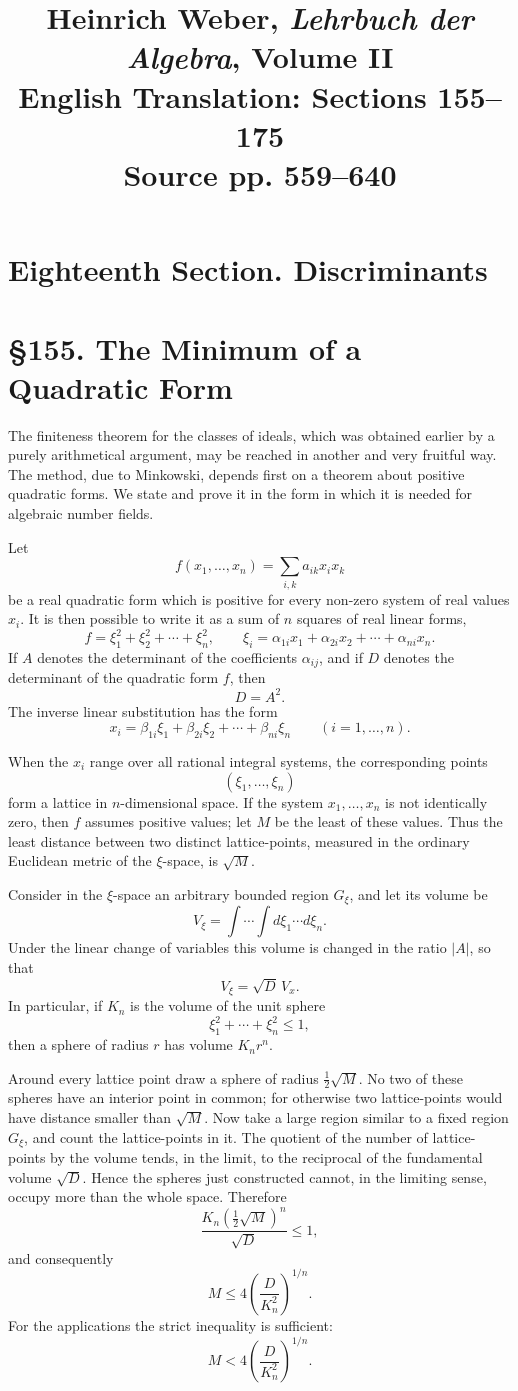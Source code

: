 \documentclass[12pt,a4paper]{article}
\title{Heinrich Weber, \emph{Lehrbuch der Algebra}, Volume II\\English Translation: Sections 155--175\\Source pp. 559--640}
\author{}
\date{}
\newcommand{\webersection}[2]{\clearpage\section*{\S #1. #2}}
\newcommand{\booktitle}[1]{\clearpage\section*{#1}}
\begin{document}
\maketitle


\booktitle{Eighteenth Section. Discriminants}

\webersection{155}{The Minimum of a Quadratic Form}

The finiteness theorem for the classes of ideals, which was obtained earlier by a purely arithmetical argument, may be reached in another and very fruitful way.  The method, due to Minkowski, depends first on a theorem about positive quadratic forms.  We state and prove it in the form in which it is needed for algebraic number fields.

Let
\[
  f(x_1,\ldots,x_n)=\sum_{i,k} a_{ik}x_i x_k
\]
be a real quadratic form which is positive for every non-zero system of real values \(x_i\).  It is then possible to write it as a sum of \(n\) squares of real linear forms,
\[
  f=\xi_1^2+\xi_2^2+\cdots+\xi_n^2,\qquad
  \xi_i=\alpha_{1i}x_1+\alpha_{2i}x_2+\cdots+\alpha_{ni}x_n.
\]
If \(A\) denotes the determinant of the coefficients \(\alpha_{ij}\), and if \(D\) denotes the determinant of the quadratic form \(f\), then
\[
  D=A^2.
\]
The inverse linear substitution has the form
\[
  x_i=\beta_{1i}\xi_1+\beta_{2i}\xi_2+\cdots+\beta_{ni}\xi_n
  \qquad (i=1,\ldots,n).
\]

When the \(x_i\) range over all rational integral systems, the corresponding points
\[
  (\xi_1,\ldots,\xi_n)
\]
form a lattice in \(n\)-dimensional space.  If the system \(x_1,\ldots,x_n\) is not identically zero, then \(f\) assumes positive values; let \(M\) be the least of these values.  Thus the least distance between two distinct lattice-points, measured in the ordinary Euclidean metric of the \(\xi\)-space, is \(\sqrt M\).

Consider in the \(\xi\)-space an arbitrary bounded region \(G_\xi\), and let its volume be
\[
  V_\xi=\int\cdots\int d\xi_1\cdots d\xi_n.
\]
Under the linear change of variables this volume is changed in the ratio \(|A|\), so that
\[
  V_\xi=\sqrt D\,V_x.
\]
In particular, if \(K_n\) is the volume of the unit sphere
\[
  \xi_1^2+\cdots+\xi_n^2\le 1,
\]
then a sphere of radius \(r\) has volume \(K_n r^n\).

Around every lattice point draw a sphere of radius \(\frac12\sqrt M\).  No two of these spheres have an interior point in common; for otherwise two lattice-points would have distance smaller than \(\sqrt M\).  Now take a large region similar to a fixed region \(G_\xi\), and count the lattice-points in it.  The quotient of the number of lattice-points by the volume tends, in the limit, to the reciprocal of the fundamental volume \(\sqrt D\).  Hence the spheres just constructed cannot, in the limiting sense, occupy more than the whole space.  Therefore
\[
  \frac{K_n \left(\frac12\sqrt M\right)^n}{\sqrt D}\le 1,
\]
and consequently
\[
  M\le 4\left(\frac{D}{K_n^2}\right)^{1/n}.
\]
For the applications the strict inequality is sufficient:
\[
  M<4\left(\frac{D}{K_n^2}\right)^{1/n}.
\]
\end{document}
